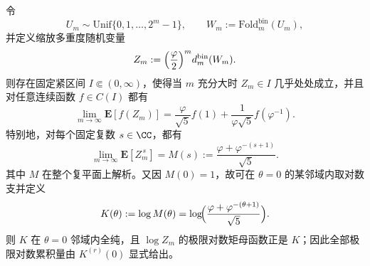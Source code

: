 \begin{theorem}\label{thm:xi-binfold-scaled-multiplicity-mellin-cumulants}
令
\[
U_m\sim \mathrm{Unif}\{0,1,\dots,2^m-1\},
\qquad
W_m:=\mathrm{Fold}^{\mathrm{bin}}_m(U_m),
\]
并定义缩放多重度随机变量
\[
Z_m:=\Bigl(\frac{\varphi}{2}\Bigr)^m d_m^{\mathrm{bin}}(W_m).
\]
则存在固定紧区间 \(I\Subset(0,\infty)\)，使得当 \(m\) 充分大时 \(Z_m\in I\) 几乎处处成立，并且对任意连续函数 \(f\in C(I)\) 都有
\[
\lim_{m\to\infty}\mathbf E[f(Z_m)]
=
\frac{\varphi}{\sqrt5}f(1)+\frac{1}{\varphi\sqrt5}f(\varphi^{-1}).
\]
特别地，对每个固定复数 \(s\in\CC\)，都有
\[
\lim_{m\to\infty}\mathbf E[Z_m^{\,s}]
=
M(s):=\frac{\varphi+\varphi^{-(s+1)}}{\sqrt5}.
\]
其中 \(M\) 在整个复平面上解析。又因 \(M(0)=1\)，故可在 \(\theta=0\) 的某邻域内取对数支并定义
\[
K(\theta):=\log M(\theta)
=
\log\!\Bigl(\frac{\varphi+\varphi^{-(\theta+1)}}{\sqrt5}\Bigr).
\]
则 \(K\) 在 \(\theta=0\) 邻域内全纯，且 \(\log Z_m\) 的极限对数矩母函数正是 \(K\)；因此全部极限对数累积量由 \(K^{(r)}(0)\) 显式给出。
\end{theorem}
